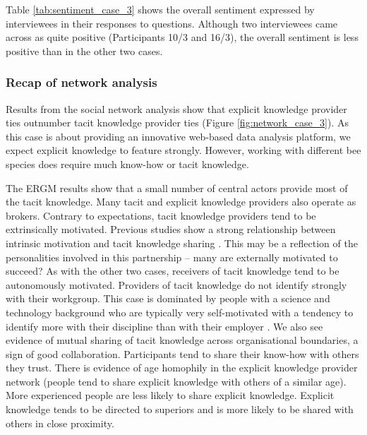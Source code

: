 Table \ref{tab:sentiment_case_3} shows the overall sentiment expressed by interviewees in their responses to questions. Although two interviewees came across as quite positive (Participants 10/3 and 16/3), the overall sentiment is less positive than in the other two cases.

\subsubsection{Recap of network analysis}

Results from the social network analysis show that explicit knowledge provider ties outnumber tacit knowledge provider ties (Figure \ref{fig:network_case_3}). As this case is about providing an innovative web-based data analysis platform, we expect explicit knowledge to feature strongly. However, working with different bee species does require much know-how or tacit knowledge. \medskip

The ERGM results show that a small number of central actors provide most of the tacit knowledge. Many tacit and explicit knowledge providers also operate as brokers. Contrary to expectations, tacit knowledge providers tend to be extrinsically motivated. Previous studies show a strong relationship between intrinsic motivation and tacit knowledge sharing \citep[e.g.][]{osterloh2000motivation,kaser2001knowledge,hau2013effects,shao2017charismatic}. This may be a reflection of the personalities involved in this partnership -- many are externally motivated to succeed? As with the other two cases, receivers of tacit knowledge tend to be autonomously motivated. Providers of tacit knowledge do not identify strongly with their workgroup. This case is dominated by people with a science and technology background who are typically very self-motivated with a tendency to identify more with their discipline than with their employer \citep{stephan1996economics}. We also see evidence of mutual sharing of tacit knowledge across organisational boundaries, a sign of good collaboration. Participants tend to share their know-how with others they trust. There is evidence of age homophily in the explicit knowledge provider network (people tend to share explicit knowledge with others of a similar age). More experienced people are less likely to share explicit knowledge. Explicit knowledge tends to be directed to superiors and is more likely to be shared with others in close proximity. \medskip

